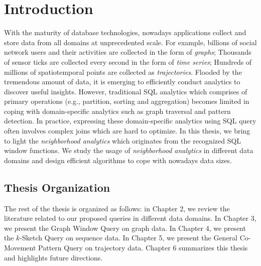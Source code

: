 \chapter{Introduction}
With the maturity of database technologies, nowadays
applications collect and store data from all domains 
at unprecedented scale. For example, billions of 
social network users and their activities are collected in the form
of \emph{graphs}; Thousands of sensor ticks are collected every second
in the form of \emph{time series}; Hundreds of millions of spatiotemporal points
are collected as \emph{trajectories}.
Flooded by the tremendous amount of data, 
it is emerging to efficiently conduct analytics to discover useful insights.
However, traditional SQL analytics which comprises 
of primary operations (e.g., partition, sorting and aggregation) 
becomes limited in coping with domain-specific analytics 
such as graph traversal and pattern detection. 
In practice, expressing these domain-specific 
analytics using SQL query often involves 
complex joins which are hard to optimize. 
In this thesis, we bring to light the \emph{neighborhood analytics} which
originates from the recognized SQL window functions. We study
the usage of \emph{neighborhood analytics} in different data domains
and design efficient algorithms to cope with nowadays data sizes.

%




 


\section{Thesis Organization}
The rest of the thesis is organized as follows: in Chapter 2, we review the literature related
to our proposed queries in different data domains.
In Chapter 3, we present the Graph Window Query on graph data. 
In Chapter 4, we present the $k$-Sketch Query on sequence data.
In Chapter 5, we present the General Co-Movement Pattern Query on trajectory data. 
Chapter 6 summarizes this thesis and highlights future directions.
